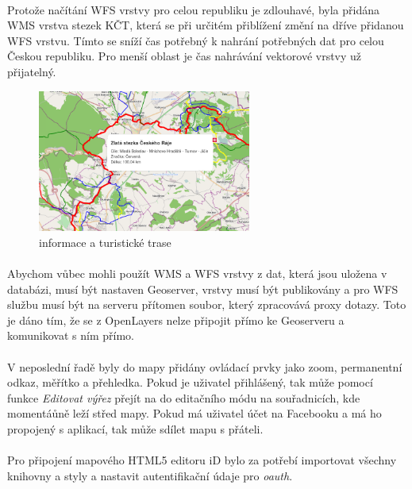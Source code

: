 \documentclass[11pt,a4paper,titlepage,oneside]{book}
\begin{document}
			\paragraph{} Protože načítání WFS vrstvy pro celou republiku je zdlouhavé, byla přidána WMS vrstva stezek KČT, která se při určitém přiblížení změní na dříve přidanou WFS vrstvu. Tímto se sníží čas potřebný k nahrání potřebných dat pro celou Českou republiku. Pro menší oblast je čas nahrávání vektorové vrstvy už přijatelný.
		\begin{figure}[!h]
			\begin{center}
				\includegraphics[width=7cm]{obrazky/toulavej/infoTrack.png}
				\caption{informace a turistické trase}
				\label{fig:infoTrack}
			\end{center}
		\end{figure}	

			\paragraph{} Abychom vůbec mohli použít WMS a WFS vrstvy z dat, která jsou uložena v databázi, musí být nastaven Geoserver, vrstvy musí být publikovány a pro WFS službu musí být na serveru přítomen soubor, který zpracovává proxy dotazy. Toto je dáno tím, že se z OpenLayers nelze připojit přímo ke Geoserveru a komunikovat s ním přímo. 
			\paragraph{} V neposlední řadě byly do mapy přidány ovládací prvky jako zoom, permanentní odkaz, měřítko a přehledka. Pokud je uživatel přihlášený, tak může pomocí funkce \textit{Editovat výřez} přejít na do editačního módu na souřadnicích, kde momentáůně leží střed mapy. Pokud má uživatel účet na Facebooku a má ho propojený s aplikací, tak může sdílet mapu s přáteli.
			\paragraph{}Pro připojení mapového HTML5 editoru iD bylo za potřebí importovat všechny knihovny a styly a nastavit autentifikační údaje pro \textit{oauth}. 
\end{document}

